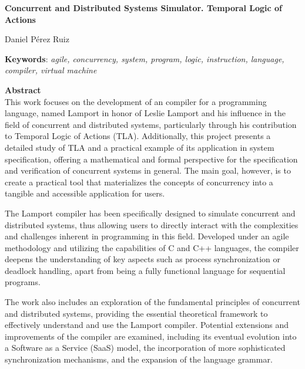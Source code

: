 \cleardoublepage

\begin{center}
	{\large\bfseries Concurrent and Distributed Systems Simulator. Temporal Logic of Actions}\\
\end{center}
\begin{center}
	Daniel Pérez Ruiz\\
\end{center}
\vspace{0.5cm}
\noindent\textbf{Keywords}: \textit{agile, concurrency, system, program, logic, instruction, language, compiler, virtual machine}
\vspace{0.7cm}

\noindent\textbf{Abstract}\\
This work focuses on the development of an compiler for a programming language, named Lamport in honor of Leslie Lamport and his influence in the field of concurrent and distributed systems, particularly through his contribution to Temporal Logic of Actions (TLA). Additionally, this project presents a detailed study of TLA and a practical example of its application in system specification, offering a mathematical and formal perspective for the specification and verification of concurrent systems in general. The main goal, however, is to create a practical tool that materializes the concepts of concurrency into a tangible and accessible application for users.

The Lamport compiler has been specifically designed to simulate concurrent and distributed systems, thus allowing users to directly interact with the complexities and challenges inherent in programming in this field. Developed under an agile methodology and utilizing the capabilities of C and C++ languages, the compiler deepens the understanding of key aspects such as process synchronization or deadlock handling, apart from being a fully functional language for sequential programs.

The work also includes an exploration of the fundamental principles of concurrent and distributed systems, providing the essential theoretical framework to effectively understand and use the Lamport compiler. Potential extensions and improvements of the compiler are examined, including its eventual evolution into a Software as a Service (SaaS) model, the incorporation of more sophisticated synchronization mechanisms, and the expansion of the language grammar.



